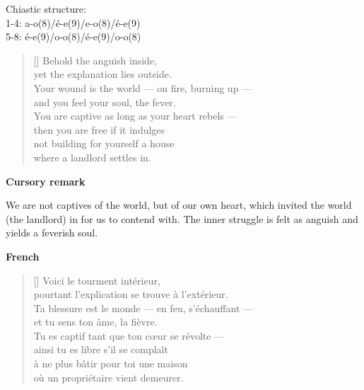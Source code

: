 \documentclass[a4paper,12pt,twoside,final]{book}
\begin{document}
\noindent Chiastic structure: \\
1-4: a-o(8)/é-e(9)/e-o(8)/é-e(9) \\
5-8: é-e(9)/o-o(8)/é-e(9)/o-o(8)

\newpage


\settowidth{\versewidth}{Your wound is the world --- on fire, burning up ---}

\begin{verse}[\versewidth]
  Behold the anguish inside, \\
  yet the explanation lies outside. \\
  Your wound is the world --- on fire, burning up --- \\
  and you feel your soul, the fever. \\
  You are captive as long as your heart rebels --- \\
  then you are free if it indulges \\
  not building for yourself a house \\
  where a landlord settles in. \\
\end{verse}

\bigskip

\noindent \textbf{Cursory remark}

\medskip

We are not captives of the world, but of our own heart, which invited
the world (the landlord) in for us to contend with. The inner struggle
is felt as anguish and yields a feverish soul.

\bigskip

\noindent \textbf{French}


\settowidth{\versewidth}{Ta blessure est le monde --- en feu, s'échauffant ---}

\begin{verse}[\versewidth]
  Voici le tourment intérieur, \\
  pourtant l'explication se trouve à l'extérieur. \\
  Ta blessure est le monde --- en feu, s'échauffant --- \\
  et tu sens ton âme, la fièvre. \\
  Tu es captif tant que ton cœur se révolte --- \\
  ainsi tu es libre s'il se complaît \\
  à ne plus bâtir pour toi une maison \\
  où un propriétaire vient demeurer. \\
\end{verse}
\end{document}
